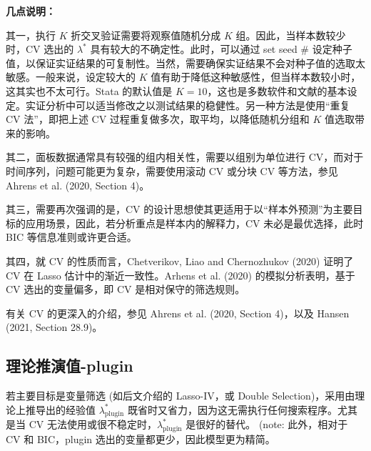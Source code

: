 

\textbf{几点说明：}

其一，执行 $K$ 折交叉验证需要将观察值随机分成 $K$ 组。因此，当样本数较少时，CV 选出的 $\lambda^*$ 具有较大的不确定性。此时，可以通过 set seed \# 设定种子值，以保证实证结果的可复制性。当然，需要确保实证结果不会对种子值的选取太敏感。一般来说，设定较大的 $K$ 值有助于降低这种敏感性，但当样本数较小时，这其实也不太可行。Stata 的默认值是 $K=10$，这也是多数软件和文献的基本设定。实证分析中可以适当修改之以测试结果的稳健性。另一种方法是使用“重复 CV 法”，即把上述 CV 过程重复做多次，取平均，以降低随机分组和 $K$ 值选取带来的影响。


其二，面板数据通常具有较强的组内相关性，需要以组别为单位进行 CV，而对于时间序列，问题可能更为复杂，需要使用滚动 CV 或分块 CV 等方法，参见 Ahrens et al. (2020, Section 4)。 

其三，需要再次强调的是，CV 的设计思想使其更适用于以“样本外预测”为主要目标的应用场景，因此，若分析重点是样本内的解释力，CV 未必是最优选择，此时 BIC 等信息准则或许更合适。

其四，就 CV 的性质而言，Chetverikov, Liao and Chernozhukov (2020) 证明了 CV 在 Lasso 估计中的渐近一致性。Arhens et al. (2020) 的模拟分析表明，基于 CV 选出的变量偏多，即 CV 是相对保守的筛选规则。 

有关 CV 的更深入的介绍，参见 Ahrens et al. (2020, Section 4)，以及 Hansen (2021, Section 28.9)。


\subsection{理论推演值-plugin}\label{sec:lasso-plugin}



若主要目标是变量筛选 (如后文介绍的 Lasso-IV，或 Double Selection)，采用由理论上推导出的经验值 $\lambda_{\text{plugin}}^*$ 既省时又省力，因为这无需执行任何搜索程序。尤其是当 CV 无法使用或很不稳定时，$\lambda_{\text{plugin}}^*$ 是很好的替代。 (note: %
此外，相对于 CV 和 BIC，plugin 选出的变量都更少，因此模型更为精简。

